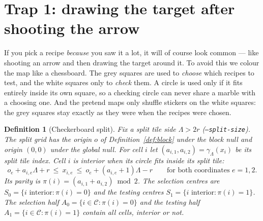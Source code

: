 \documentclass[11pt,a4paper]{article}
\newtheorem{definition}{Definition}[section]
\theoremstyle{remark}
\newcommand{\cells}{\mathcal{C}}
\begin{document}
\section{Trap 1: drawing the target after shooting the arrow}
\label{sec:split}

\begin{plain}
If you pick a recipe \emph{because} you saw it a lot, it will of course look
common --- like shooting an arrow and then drawing the target around it. To
avoid this we colour the map like a chessboard. The grey squares are used to
\emph{choose} which recipes to test, and the white squares only to
\emph{check} them. A circle is used only if it fits entirely inside its own
square, so a checking circle can never share a marble with a choosing one. And
the pretend maps only shuffle stickers on the white squares: the grey squares
stay exactly as they were when the recipes were chosen.
\end{plain}

\begin{center}
\end{center}

\begin{definition}[Checkerboard split]
\label{def:split}
Fix a split tile side $\Lambda>2r$ (\texttt{--split-size}). The split grid has
the origin $o$ of Definition~\ref{def:block} under the block null and origin
$(0,0)$ under the global null. For cell $i$ let
$(a_{i,1},a_{i,2})=\gamma_\Lambda(x_i)$ be its split tile index. Cell $i$ is
\emph{interior} when its circle fits inside its split tile:
\[
  o_e+a_{i,e}\Lambda+r\ \le\ x_{i,e}\ \le\ o_e+(a_{i,e}+1)\Lambda-r
  \qquad\text{for both coordinates } e=1,2.
\]
Its \emph{parity} is $\pi(i)=(a_{i,1}+a_{i,2})\bmod 2$. The selection centres
are $S_0=\{i\text{ interior}:\pi(i)=0\}$ and the testing centres
$S_1=\{i\text{ interior}:\pi(i)=1\}$. The selection half
$A_0=\{i\in\cells:\pi(i)=0\}$ and the testing half
$A_1=\{i\in\cells:\pi(i)=1\}$ contain all cells, interior or not.
\end{definition}
\end{document}
